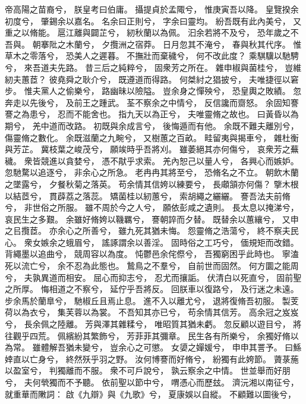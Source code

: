 
\begin{pinyinscope}

帝高陽之苗裔兮，
朕皇考曰伯庸。
攝提貞於孟陬兮，
惟庚寅吾以降。
皇覽揆余初度兮，
肇錫余以嘉名。
名余曰正則兮，
字余曰靈均。
紛吾既有此內美兮，
又重之以脩能。
扈江離與闢芷兮，
紉秋蘭以為佩。
汩余若將不及兮，
恐年歲之不吾與。
朝搴阰之木蘭兮，
夕攬洲之宿莽。
日月忽其不淹兮，
春與秋其代序。
惟草木之零落兮，
恐美人之遲暮。
不撫壯而棄穢兮，
何不改此度？
乘騏驥以馳騁兮，
來吾道夫先路。
昔三后之純粹兮，
固衆芳之所在。
雜申椒與菌桂兮，
豈維紉夫蕙茝？
彼堯舜之耿介兮，
既遵道而得路。
何桀紂之猖披兮，
夫唯捷徑以窘步。
惟夫黨人之偷樂兮，
路幽昧以險隘。
豈余身之憚殃兮，
恐皇輿之敗績。
忽奔走以先後兮，
及前王之踵武。
荃不察余之中情兮，
反信讒而齌怒。
余固知謇謇之為患兮，
忍而不能舍也。
指九天以為正兮，
夫唯靈脩之故也。
曰黃昏以為期兮，
羌中道而改路。
初既與余成言兮，
後悔遁而有他。
余既不難夫離別兮，
傷靈脩之數化。
余既滋蘭之九畹兮，
又樹蕙之百畝。
畦留夷與揭車兮，
雜杜衡與芳芷。
冀枝葉之峻茂兮，
願竢時乎吾將刈。
雖萎絕其亦何傷兮，
哀衆芳之蕪穢。
衆皆競進以貪婪兮，
憑不猒乎求索。
羌內恕己以量人兮，
各興心而嫉妒。
忽馳騖以追逐兮，
非余心之所急。
老冉冉其將至兮，
恐脩名之不立。
朝飲木蘭之墜露兮，
夕餐秋菊之落英。
苟余情其信姱以練要兮，
長顑頷亦何傷？
擥木根以結茝兮，
貫薜荔之落蕊。
矯菌桂以紉蕙兮，
索胡繩之纚纚。
謇吾法夫前脩兮，
非世俗之所服。
雖不周於今之人兮，
願依彭咸之遺則。
長太息以掩涕兮，
哀民生之多艱。
余雖好脩姱以鞿羈兮，
謇朝誶而夕替。
既替余以蕙纕兮，
又申之㠯攬茝。
亦余心之所善兮，
雖九死其猶未悔。
怨靈脩之浩蕩兮，
終不察夫民心。
衆女嫉余之蛾眉兮，
謠諑謂余以善淫。
固時俗之工巧兮，
偭規矩而改錯。
背繩墨以追曲兮，
競周容以為度。
忳鬱邑余侘傺兮，
吾獨窮困乎此時也。
寧溘死以流亡兮，
余不忍為此態也。
鷙鳥之不羣兮，
自前世而固然。
何方圜之能周兮，
夫孰異道而相安。
屈心而抑志兮，
忍尤而攘詬。
伏清白以死直兮，
固前聖之所厚。
悔相道之不察兮，
延佇乎吾將反。
回朕車以復路兮，
及行迷之未遠。
步余馬於蘭臯兮，
馳椒丘且焉止息。
進不入以離尤兮，
退將復脩吾初服。
製芰荷以為衣兮，
集芙蓉以為裳。
不吾知其亦已兮，
苟余情其信芳。
高余冠之岌岌兮，
長余佩之陸離。
芳與澤其雜糅兮，
唯昭質其猶未虧。
忽反顧以遊目兮，
將往觀乎四荒。
佩繽紛其繁飾兮，
芳菲菲其彌章。
民生各有所樂兮，
余獨好脩以為常。
雖體解吾猶未變兮，
豈余心之可懲。
女嬃之嬋媛兮，
申申其詈予。
曰鯀婞直以亡身兮，
終然殀乎羽之野。
汝何博謇而好脩兮，
紛獨有此姱節。
薋菉葹以盈室兮，
判獨離而不服。
衆不可戶說兮，
孰云察余之中情。
世並舉而好朋兮，
夫何煢獨而不予聽。
依前聖以節中兮，
喟憑心而歷玆。
濟沅湘以南征兮，
就重華而敶詞：
啟《九辯》與《九歌》兮，
夏康娛以自縱。
不顧難以圖後兮，

\end{pinyinscope}
